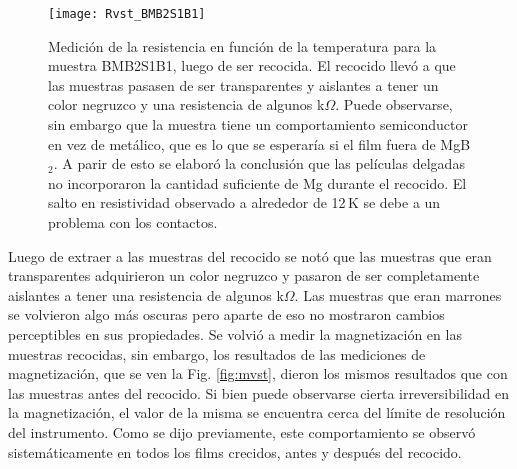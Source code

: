  \begin{figure}[tbh!]
   \begin{center}
	 \texttt{[image: Rvst\_BMB2S1B1]}
   \end{center}
   \caption[Medición de la resistencia en función de la temperatura para la muestra BMB2S1B1, luego de ser recocida.]{Medición de la resistencia en función de la temperatura para la muestra BMB2S1B1, luego de ser recocida. El recocido llevó a que las muestras pasasen de ser transparentes y aislantes a tener un color negruzco y una resistencia de algunos k$\Omega$. Puede observarse, sin embargo que la muestra tiene un comportamiento semiconductor en vez de metálico, que es lo que se esperaría si el film fuera de MgB$_2$. A parir de esto se elaboró la conclusión que las películas delgadas no incorporaron la cantidad suficiente de Mg durante el recocido. El salto en resistividad observado a alrededor de 12\,K se debe a un problema con los contactos.}
   \label{fig:rvstS1B1}
 \end{figure}
 
 Luego de extraer a las muestras del recocido se notó que las muestras que eran transparentes adquirieron un color negruzco y pasaron de ser completamente aislantes a tener una resistencia de algunos k$\Omega$. Las muestras que eran marrones se volvieron algo más oscuras pero aparte de eso no mostraron cambios perceptibles en sus propiedades. Se volvió a medir la magnetización en las muestras recocidas, sin embargo, los resultados de las mediciones de magnetización, que se ven la Fig. \ref{fig:mvst}, dieron los mismos resultados que con las muestras antes del recocido. Si bien puede observarse cierta irreversibilidad en la magnetización, el valor de la misma se encuentra cerca del límite de resolución del instrumento. Como se dijo previamente, este comportamiento se observó sistemáticamente en todos los films crecidos, antes y después del recocido.

